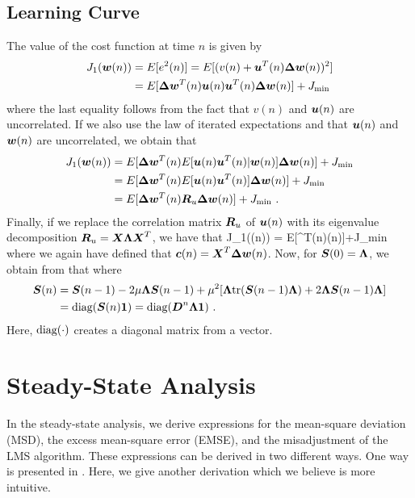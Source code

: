 \subsection{Learning Curve}
The value of the cost function at time $n$ is given by
\begin{align}
  J_1(\boldsymbol{w}(n)) &= E[e^2(n)] = E[(v(n)+\boldsymbol{u}^T(n)\boldsymbol{\Delta}\boldsymbol{w}(n))^2]\\
  &= E[\boldsymbol{\Delta}\boldsymbol{w}^T(n)\boldsymbol{u}(n)\boldsymbol{u}^T(n)\boldsymbol{\Delta}\boldsymbol{w}(n)]+J_\textup{min}
\end{align}
where the last equality follows from the fact that $v(n)$ and $\boldsymbol{u}(n)$ are uncorrelated. If we also use the law of iterated expectations and that $\boldsymbol{u}(n)$ and $\boldsymbol{w}(n)$ are uncorrelated, we obtain that 
\begin{align}
  J_1(\vect{w}(n)) &= E[\vect{\Delta}\vect{w}^T(n)E[\vect{u}(n)\vect{u}^T(n)|\vect{w}(n)]\vect{\Delta}\vect{w}(n)]+J_\textup{min}\\
  &= E[\vect{\Delta}\vect{w}^T(n)E[\vect{u}(n)\vect{u}^T(n)]\vect{\Delta}\vect{w}(n)]+J_\textup{min}\\
  &= E[\vect{\Delta}\vect{w}^T(n)\vect{R}_u\vect{\Delta}\vect{w}(n)]+J_\textup{min}\ .
\end{align}
Finally, if we replace the correlation matrix $\boldsymbol{R}_u$ of $\boldsymbol{u}(n)$ with its eigenvalue decomposition $\boldsymbol{R}_u=\boldsymbol{X\Lambda X}^T$, we have that 
\bmath
  J_1((n)) = E[^T(n)\vect{\Lambda}(n)]+J_\textup{min}
\emath
where we again have defined that $\boldsymbol{c}(n)= \boldsymbol{X}^T\boldsymbol{\Delta}\boldsymbol{w}(n)$. Now, for $\boldsymbol{S}(0)=\boldsymbol{\Lambda}$, we obtain from  that
\bmath
    \label{eq:app_lms_learning_curve}
\emath
where
\begin{align}
  \boldsymbol{S}(n) &= \boldsymbol{S}(n-1) - 2\mu\boldsymbol{\Lambda}\boldsymbol{S}(n-1)+\mu^2[\boldsymbol{\Lambda}\textup{tr}(\boldsymbol{S}(n-1)\boldsymbol{\Lambda})+2\boldsymbol{\Lambda}\boldsymbol{S}(n-1)\boldsymbol{\Lambda}]\\
  &= \textup{diag}(\boldsymbol{S}(n)\boldsymbol{1}) = \textup{diag}(\boldsymbol{D}^n\boldsymbol{\Lambda}\boldsymbol{1})\ .
\end{align}
Here, $\textup{diag}(\cdot)$ creates a diagonal matrix from a vector.

\section{Steady-State Analysis}
In the steady-state analysis, we derive expressions for the mean-square deviation (MSD), the excess mean-square error (EMSE), and the misadjustment of the LMS algorithm. These expressions can be derived in two different ways. One way is presented in \cite[pp.~462--465]{Sayed2003}. Here, we give another derivation which we believe is more intuitive.

